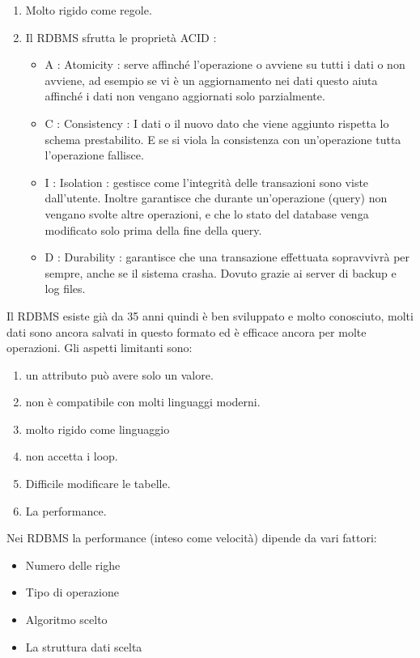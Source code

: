 \documentclass[a4page, 11pt]{article}
\begin{document}
\begin{enumerate}[noitemsep]
	 
	\item
	Molto rigido come regole.
	\item
	Il RDBMS sfrutta le proprietà ACID :
	\begin{itemize}
		
		\item
		A : Atomicity : serve affinché l'operazione o avviene su tutti i dati o non avviene, ad esempio se vi è un aggiornamento nei dati questo aiuta affinché i dati non vengano aggiornati solo parzialmente.
		\item
		C : Consistency : I dati o il nuovo dato che viene aggiunto rispetta lo schema prestabilito. E se si viola la consistenza con un'operazione tutta l'operazione fallisce.
		\item
		I : Isolation : gestisce come l'integrità delle transazioni sono viste dall'utente. Inoltre garantisce che durante un'operazione (query) non vengano svolte altre operazioni, e che lo stato del database venga modificato solo prima della fine della query.
		\item
		D : Durability : garantisce che una transazione effettuata sopravvivrà per sempre, anche se il sistema crasha. Dovuto grazie ai server di
		backup e log files.
	\end{itemize}
\end{enumerate}
Il RDBMS esiste già da 35 anni quindi è ben sviluppato e molto conosciuto, molti dati sono ancora salvati in questo formato ed è efficace ancora per molte operazioni. Gli aspetti limitanti sono:

\begin{enumerate}[noitemsep]
	 
	\item
	un attributo può avere solo un valore.
	\item
	non è compatibile con molti linguaggi moderni.
	\item
	molto rigido come linguaggio
	\item
	non accetta i loop.
	\item
	Difficile modificare le tabelle.
	\item
	La performance.
\end{enumerate}
Nei RDBMS la performance (inteso come velocità) dipende da vari fattori:
\begin{itemize}[noitemsep]
	 
	\item
	Numero delle righe
	\item
	Tipo di operazione
	\item
	Algoritmo scelto
	\item
	La struttura dati scelta
\end{itemize}
\end{document}
